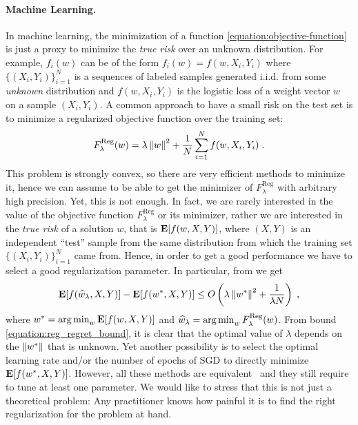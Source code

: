 \paragraph{Machine Learning.}
In machine learning, the minimization of a function
\eqref{equation:objective-function} is just a proxy to minimize the \emph{true
risk} over an unknown distribution. For example, $f_i(w)$ can be of the form
$f_i(w) = f(w, X_i, Y_i)$ where $\{(X_i, Y_i)\}_{i=1}^N$ is a sequences of
labeled samples generated i.i.d. from some \emph{unknown} distribution and $f(w,
X_i, Y_i)$ is the logistic loss of a weight vector $w$ on a sample $(X_i, Y_i)$.
A common approach to have a small risk on the test set is to minimize a
regularized objective function over the training set:
%
\begin{equation}
\label{equation:reg_logloss}
F_\lambda^{\text{Reg}}(w) = \lambda \left\|{w}\right\|^2 + \frac{1}{N} \sum_{i=1}^N f(w, X_i, Y_i) \; .
\end{equation}
%
This problem is strongly convex, so there are very efficient methods to minimize
it, hence we can assume to be able to get the minimizer of
$F_\lambda^{\text{Reg}}$ with arbitrary high precision. Yet, this is not enough.
In fact, we are rarely interested in the value of the objective function
$F_\lambda^{\text{Reg}}$ or its minimizer, rather we are interested in the
\emph{true risk} of a solution $w$, that is $\operatorname*{\mathbf{E}}[f(w,X,Y)]$, where $(X,Y)$ is
an independent ``test'' sample from the same distribution from which the
training set $\{(X_i,Y_i)\}_{i=1}^N$ came from. Hence, in order to get a good
performance we have to select a good regularization parameter. In particular,
from \cite{Sridharan-Shalev-Shwartz-Srebro-2009} we get
\begin{equation}
\label{equation:reg_regret_bound}
\operatorname*{\mathbf{E}}[f(\widehat{w}_\lambda,X,Y)] - \operatorname*{\mathbf{E}}[f(w^*,X,Y)] \le O\left(\lambda \left\|{w^*}\right\|^2 + \frac{1}{\lambda N} \right) \; ,
\end{equation}
where $w^*=\operatorname*{arg\,min}_w \operatorname*{\mathbf{E}}[f(w,X,Y)]$ and $\widehat{w}_\lambda = \operatorname*{arg\,min}_w
F_\lambda^{\text{Reg}}(w)$.  From bound \eqref{equation:reg_regret_bound}, it is
clear that the optimal value of $\lambda$ depends on the $\left\|{w^*}\right\|$ that is
unknown.  Yet another possibility is to select the optimal learning rate and/or
the number of epochs of \ac{SGD} to directly minimize $\operatorname*{\mathbf{E}}[f(w^*,X,Y)]$.
However, all these methods are equivalent~\citep{Lin-Camoriano-Rosasco-2016} and
they still require to tune at least one parameter. We would like to stress that
this is not just a theoretical problem: Any practitioner knows how painful it is
to find the right regularization for the problem at hand.

